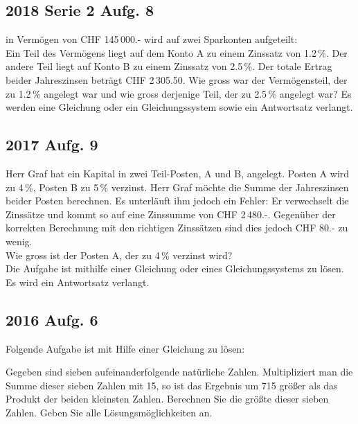 \subsection{2018 Serie 2 Aufg. 8}
in Vermögen von CHF 145\,000.- wird auf zwei Sparkonten aufgeteilt:\\
Ein Teil des Vermögens liegt auf dem Konto A zu einem Zinssatz von 1.2\,\%.
Der andere Teil liegt auf Konto B zu einem Zinssatz von 2.5\,\%.
Der totale Ertrag beider Jahreszinsen beträgt CHF 2\,305.50.
Wie gross war der Vermögensteil, der zu 1.2\,\% angelegt war und wie gross
derjenige Teil, der zu 2.5\,\% angelegt war?
Es werden eine Gleichung oder ein Gleichungssystem sowie ein Antwortsatz
verlangt.


\subsection{2017 Aufg. 9}
Herr Graf hat ein Kapital in zwei Teil-Posten, A und B, angelegt. Posten A wird zu 4\,\%,
Posten B zu 5\,\% verzinst.
Herr Graf möchte die Summe der Jahreszinsen beider Posten berechnen. Es unterläuft
ihm jedoch ein Fehler: Er verwechselt die Zinssätze und kommt so auf eine Zinssumme
von CHF 2\,480.-. Gegenüber der korrekten Berechnung mit den richtigen Zinssätzen sind
dies jedoch CHF 80.- zu wenig.\\
Wie gross ist der Posten A, der zu 4\,\% verzinst wird?\\
Die Aufgabe ist mithilfe einer Gleichung oder eines Gleichungssystems zu lösen.\\
Es wird ein Antwortsatz verlangt.

\subsection{2016 Aufg. 6}
Folgende Aufgabe ist mit Hilfe einer Gleichung zu lösen:

Gegeben sind sieben aufeinanderfolgende natürliche Zahlen.
Multipliziert man die Summe dieser sieben Zahlen mit 15, so ist das Ergebnis um 715
größer als das Produkt der beiden kleinsten Zahlen.
Berechnen Sie die größte dieser sieben Zahlen. Geben Sie alle Lösungsmöglichkeiten
an.




